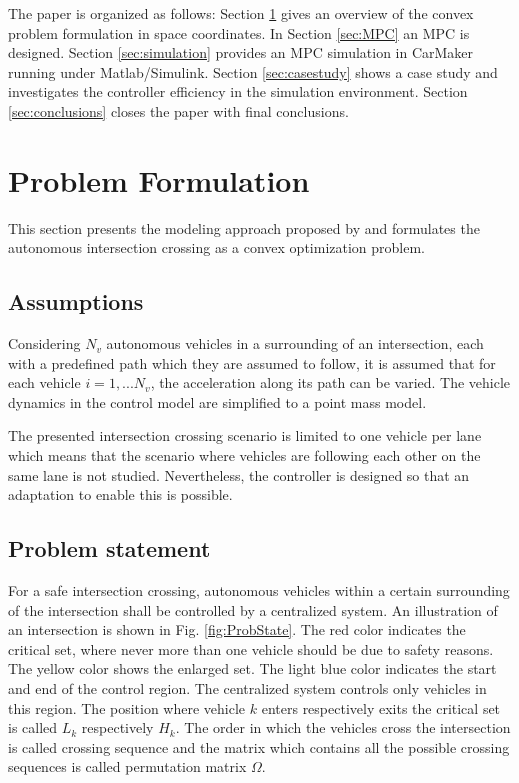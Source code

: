 \documentclass[letterpaper,10pt,conference]{ieeeconf}
\begin{document}
The paper is organized as follows: Section \ref{sec:problem_formulation} gives an overview of the convex problem formulation in space coordinates. In Section \ref{sec:MPC} an MPC is designed. Section \ref{sec:simulation} provides an MPC simulation in CarMaker running under Matlab/Simulink. Section \ref{sec:casestudy} shows a case study and investigates the controller efficiency in the simulation environment. Section \ref{sec:conclusions} closes the paper with final conclusions.

\section{Problem Formulation} \label{sec:problem_formulation}
This section presents the modeling approach proposed by \cite{nikolce} and formulates the autonomous intersection crossing as a convex optimization problem.

\subsection{Assumptions}
Considering $N_v$ autonomous vehicles in a surrounding of an intersection, each with a predefined path which they are assumed to follow, it is assumed that for each vehicle $i=1,...N_v$, the acceleration along its path can be varied. The vehicle dynamics in the control model are simplified to a point mass model.

The presented intersection crossing scenario is limited to one vehicle per lane which means that the scenario where vehicles are following each other on the same lane is not studied. Nevertheless, the controller is designed so that an adaptation to enable this is possible.

\subsection{Problem statement}
For a safe intersection crossing, autonomous vehicles within a certain surrounding of the intersection shall be controlled by a centralized system.
An illustration of an intersection is shown in Fig. \ref{fig:ProbState}. The red color indicates the critical set, where never more than one vehicle should be due to safety reasons. The yellow color shows the enlarged set. The light blue color indicates the start and end of the control region. The centralized system controls only vehicles in this region. The position where vehicle $k$ enters respectively exits the critical set is called $L_k$ respectively $H_k$. The order in which the vehicles cross the intersection is called crossing sequence and the matrix which contains all the possible crossing sequences is called permutation matrix  $\Omega$.
\end{document}
